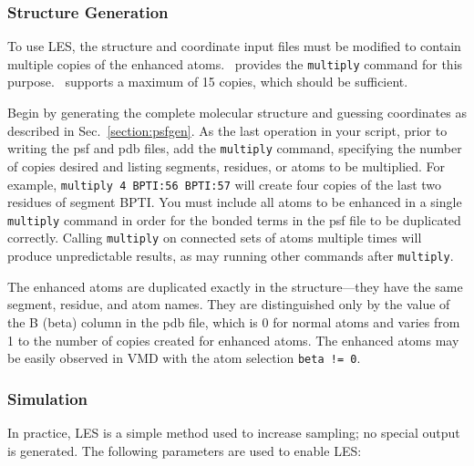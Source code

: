 \subsubsection{Structure Generation}

To use LES, the structure and coordinate input files must be modified to
contain multiple copies of the enhanced atoms.  \PSFGEN\ provides the
{\tt multiply} command for this purpose.  \NAMD\ supports a maximum of 15
copies, which should be sufficient.  

Begin by generating the complete molecular structure and guessing
coordinates as described in Sec.~\ref{section:psfgen}.  As the last
operation in your script, prior to writing the psf and pdb files, add
the {\tt multiply} command, specifying the number of copies desired and
listing segments, residues, or atoms to be multiplied.  For example,
\verb#multiply 4 BPTI:56 BPTI:57# will create four copies of the last
two residues of segment BPTI.  You must include all atoms to be
enhanced in a single {\tt multiply} command in order for the bonded
terms in the psf file to be duplicated correctly.  Calling {\tt multiply}
on connected sets of atoms multiple times will produce unpredictable
results, as may running other commands after {\tt multiply}.

The enhanced atoms are duplicated exactly in the structure---they have
the same segment, residue, and atom names.  They are distinguished only
by the value of the B (beta) column in the pdb file, which is 0 for
normal atoms and varies from 1 to the number of copies created for
enhanced atoms.  The enhanced atoms may be easily observed in VMD with
the atom selection \verb#beta != 0#.

\subsubsection{Simulation}

In practice, LES is a simple method used to increase sampling;
no special output is generated.
The following parameters are used to enable LES:

